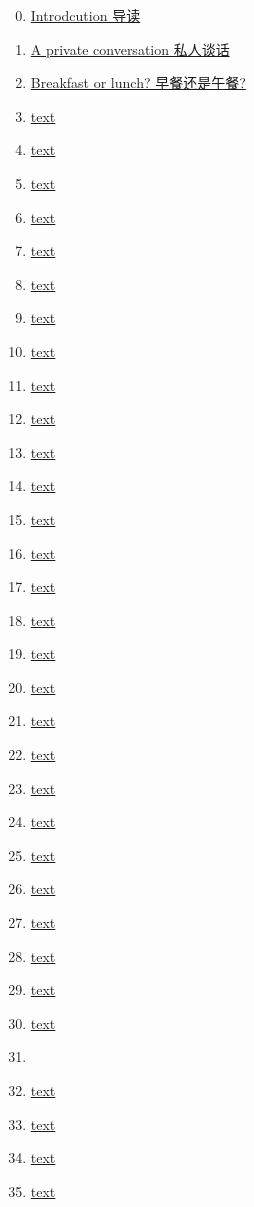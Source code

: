 \documentclass[11pt]{article}
\begin{document}
\begin{enumerate}
	\setcounter{enumi}{-1}
	\item \href{URL}{Introdcution 导读}	%
	\item \href{URL}{A private conversation 私人谈话}	%
	\item \href{URL}{Breakfast or lunch? 早餐还是午餐?}	%
	\item \href{URL}{text}	%
	\item \href{URL}{text}	%
	\item \href{URL}{text}	%
	\item \href{URL}{text}	%
	\item \href{URL}{text}	%
	\item \href{URL}{text}	%
	\item \href{URL}{text}	%
	\item \href{URL}{text}	%
	\item \href{URL}{text}	%
	\item \href{URL}{text}	%
	\item \href{URL}{text}	%
	\item \href{URL}{text}	%
	\item \href{URL}{text}	%
	\item \href{URL}{text}	%
	\item \href{URL}{text}	%
	\item \href{URL}{text}	%
	\item \href{URL}{text}	%
	\item \href{URL}{text}	%
	\item \href{URL}{text}	%
	\item \href{URL}{text}	%
	\item \href{URL}{text}	%
	\item \href{URL}{text}	%
	\item \href{URL}{text}	%
	\item \href{URL}{text}	%
	\item \href{URL}{text}	%
	\item \href{URL}{text}	%
	\item \href{URL}{text}	%
	\item \href{URL}{text}	%
	\item \href{URL}{}	%
	\item \href{URL}{text}	%
	\item \href{URL}{text}	%
	\item \href{URL}{text}	%
	\item \href{URL}{text}	%

\end{enumerate}
\end{document}
